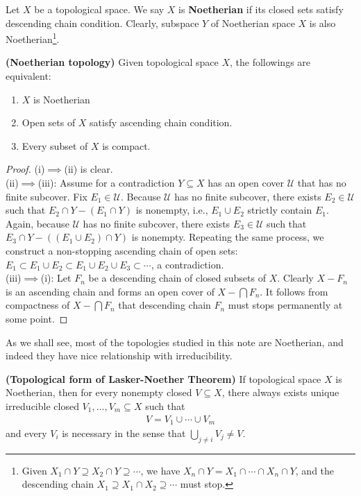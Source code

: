 \documentclass{report}
\begin{document}
Let $X$ be a topological space. We say $X$ is  \textbf{Noetherian} if its closed sets satisfy descending chain condition. Clearly, subspace $Y$ of Noetherian space $X$ is also Noetherian\footnote{Given $X_1\cap Y \supseteq X_2 \cap Y \supseteq\cdots $, we have $X_n \cap Y=X_1 \cap  \cdots \cap X_n\cap Y$, and the descending chain $X_1\supseteq X_1 \cap X_2 \supseteq \cdots$ must stop.}. 
\begin{equiv_def}
\textbf{(Noetherian topology)} Given topological space $X$, the followings are equivalent: 
\begin{enumerate}[label=(\roman*)]
  \item $X$ is Noetherian 
  \item Open sets of $X$ satisfy ascending chain condition. 
  \item Every subset of $X$ is compact. 
\end{enumerate}
\end{equiv_def}
\begin{proof}
  (i)$\implies $(ii) is clear.\\

  (ii)$\implies $(iii):  Assume for a contradiction $Y\subseteq X$ has an open cover $\mathcal{U}$ that has no finite subcover. Fix $E_1 \in \mathcal{U}$. Because $\mathcal{U}$ has no finite subcover, there exists $E_2 \in \mathcal{U}$ such that $E_2\cap Y-(E_1\cap Y)$ is nonempty, i.e., $E_1\cup E_2$ strictly contain $E_1$. Again, because $\mathcal{U}$ has no finite subcover, there exists $E_3 \in \mathcal{U}$ such that $E_3\cap Y - ((E_1 \cup  E_2) \cap Y)$ is nonempty. Repeating the same process, we construct a non-stopping ascending chain of open sets: $E_1 \subset E_1\cup E_2 \subset E_1 \cup  E_2 \cup E_3 \subset \cdots $, a contradiction. \\

  (iii)$\implies $(i): Let $F_n$ be a descending chain of closed subsets of  $X$. Clearly $X-F_n$ is an ascending chain and forms an open cover of $X- \bigcap F_n$. It follows from compactness of $X- \bigcap F_n$ that descending chain $F_n$ must stops permanently at some point.
\end{proof}
As we shall see, most of the topologies studied in this note are Noetherian, and indeed they have nice relationship with irreducibility. 
\begin{theorem}
\label{TfoL}
\textbf{(Topological form of Lasker-Noether Theorem)} If topological space $X$ is Noetherian, then for every nonempty closed $V\subseteq X$,  there always exists unique irreducible closed $V_1,\dots ,V_m \subseteq X$ such that 
\begin{gather}
V= V_1 \cup  \cdots \cup  V_m 
\end{gather}
and every $V_i$ is necessary in the sense that $\bigcup_{j\neq i}V_j\neq V$. 
\end{theorem}
\end{document}
